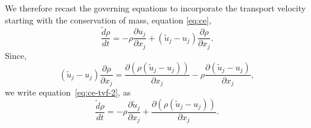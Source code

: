 \documentclass[preprint,12pt]{elsarticle}
\begin{document}
We therefore recast the governing equations to incorporate the transport
velocity starting with the conservation of mass, equation \eqref{eq:ce},
\begin{equation}
  \label{eq:ce-tvf-2}
  \frac{\tilde{d} \rho}{d t} = - \rho \frac{\partial u_j}{\partial x_j}+
  (\tilde{u}_j - u_j) \frac{\partial \rho} {\partial x_j}.
\end{equation}
Since,
\begin{equation}
  \label{eq:tmp:div-vv}
  (\tilde{u}_j - u_j)  \frac{\partial \rho}{\partial x_j} =
  \frac{\partial (\rho (\tilde{u}_j - u_j))}{\partial x_j} -
  \rho \frac{\partial (\tilde{u}_j - u_j)}{\partial x_j},
\end{equation}
we write equation~\eqref{eq:ce-tvf-2}, as
\begin{equation}
  \label{eq:ce-tvf}
  \frac{\tilde{d} \rho}{d t} =
  - \rho \frac{\partial \tilde{u}_j}{\partial x_j} +
  \frac{\partial (\rho (\tilde{u}_j - u_j))}{\partial x_j}.
\end{equation}
\end{document}
